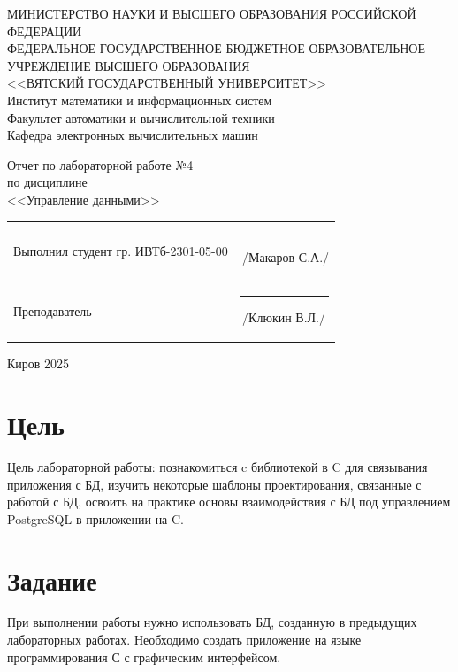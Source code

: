 \documentclass[a4paper,14pt]{extarticle}
\begin{document}
  \newpage\thispagestyle{empty}
  \begin{center}
    \MakeUppercase{
      Министерство науки и высшего образования Российской Федерации\\
      Федеральное государственное бюджетное образовательное учреждение высшего образования\\
      <<Вятский Государственный Университет>>\\
    }
    Институт математики и информационных систем\\
    Факультет автоматики и вычислительной техники\\
    Кафедра электронных вычислительных машин
  \end{center}
  \vfill

  \begin{center}
    Отчет по лабораторной работе №4\\
    по дисциплине\\
    <<Управление данными>>\\
  \end{center}
  \vfill

  \noindent
  \begin{tabular}{ll}
    Выполнил студент гр. ИВТб-2301-05-00 \hspace{5mm} &
    \rule[-1mm]{25mm}{0.10mm}\,/Макаров С.А./\\
    
    Преподаватель & \rule[-1mm]{25mm}{0.10mm}\,/Клюкин В.Л./\\
  \end{tabular}

  \vfill
  \begin{center}
    Киров 2025
  \end{center}

  \newpage
  \section*{Цель}
  Цель лабораторной работы: познакомиться c библиотекой в C для связывания приложения с БД, изучить некоторые шаблоны проектирования, связанные с работой с БД, освоить на практике основы взаимодействия с БД под управлением PostgreSQL в приложении на C.

  \section*{Задание}
  При выполнении работы нужно использовать БД, созданную в предыдущих лабораторных работах. Необходимо создать приложение на языке программирования С с графическим интерфейсом.
\end{document}
